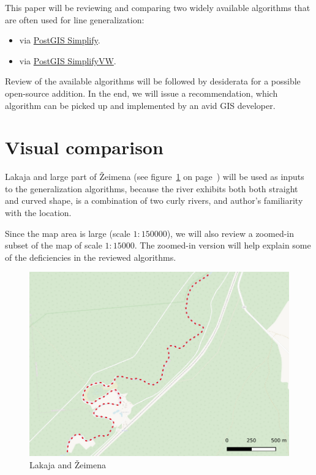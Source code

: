 \documentclass[a4paper]{article}
\begin{document}
This paper will be reviewing and comparing two widely available algorithms that
are often used for line generalization:
\begin{itemize}
    \item \cite{douglas1973algorithms} via
        \href{https://postgis.net/docs/ST_Simplify.html}{PostGIS Simplify}.

    \item \cite{visvalingam1993line} via
        \href{https://postgis.net/docs/ST_SimplifyVW.html}{PostGIS SimplifyVW}.
\end{itemize}

Review of the available algorithms will be followed by desiderata for a
possible open-source addition. In the end, we will issue a recommendation,
which algorithm can be picked up and implemented by an avid GIS developer.

\section{Visual comparison}

Lakaja and large part of Žeimena (see figure~\ref{fig:zeimena} on
page~\pageref{fig:zeimena}) will be used as inputs to the generalization
algorithms, because the river exhibits both both straight and curved shape, is
a combination of two curly rivers, and author's familiarity with the location.

Since the map area is large (scale $1:150 000$), we will also review a
zoomed-in subset of the map of scale $1:15 000$. The zoomed-in version will
help explain some of the deficiencies in the reviewed algorithms.

\begin{figure}[H]
    \centering
    \includegraphics[width=148mm]{zeimena}
    \caption{Lakaja and Žeimena}
    \label{fig:zeimena}
\end{figure}
\end{document}
